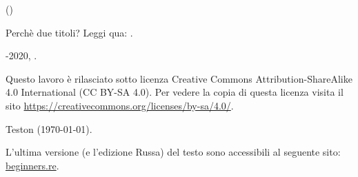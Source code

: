 ﻿\begin{titlepage}


\end{titlepage}

\newpage

\begin{center}
\vspace*{\fill}
{\LARGE \TitleMain}

\bigskip

{\large (\TitleAux)}

\bigskip
\bigskip
Perchè due titoli? Leggi qua: .

\vspace*{\fill}

{\large \AUTHOR}

{\large \TT{<\EMAIL>}}
\vspace*{\fill}
\vfill

\ccbysa

-2020, \AUTHOR.

Questo lavoro è rilasciato sotto licenza Creative Commons Attribution-ShareAlike 4.0 International (CC BY-SA 4.0).
Per vedere la copia di questa licenza visita il sito \url{https://creativecommons.org/licenses/by-sa/4.0/}.

Teston ({\large \today}).

L'ultima versione (e l'edizione Russa) del testo sono accessibili al seguente sito: \href{http://go.yurichev.com/17009}{beginners.re}.

\end{center}
